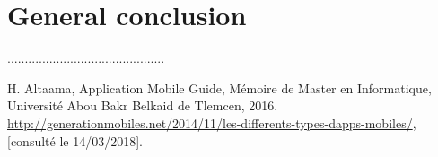 \documentclass[english,a4,12pt]{report}
\begin{document}
    

    \chapter*{General conclusion}
    \lhead{}
    \cfoot{\bfseries \thepage}

    .............................................

    \clearpage
    \pagestyle{fancy}
    \begin{thebibliography}{99}
        \lhead{}
        \cfoot{\bfseries \thepage}

        H. Altaama,
        Application Mobile Guide,
        Mémoire de Master en Informatique,
        Université Abou Bakr Belkaid de Tlemcen,
        2016.
        \url{http://generationmobiles.net/2014/11/les-differents-types-dapps-mobiles/}, [consulté le 14/03/2018].

    \end{thebibliography}
\end{document}
